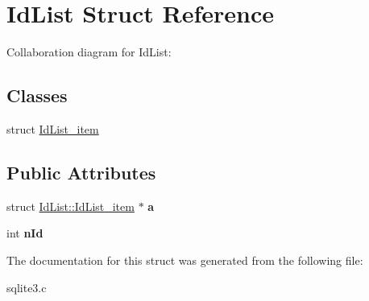 \hypertarget{structIdList}{}\section{Id\+List Struct Reference}
\label{structIdList}


Collaboration diagram for Id\+List\+:
\subsection*{Classes}
\begin{DoxyCompactItemize}
\item 
struct \hyperlink{structIdList_1_1IdList__item}{Id\+List\+\_\+item}
\end{DoxyCompactItemize}
\subsection*{Public Attributes}
\begin{DoxyCompactItemize}
\item 
struct \hyperlink{structIdList_1_1IdList__item}{Id\+List\+::\+Id\+List\+\_\+item} $\ast$ {\bfseries a}\hypertarget{structIdList_ad33082fd71286c1159711a1a3e979763}{}\label{structIdList_ad33082fd71286c1159711a1a3e979763}

\item 
int {\bfseries n\+Id}\hypertarget{structIdList_afb785717796d8b3c72d1ae682dcb6ff0}{}\label{structIdList_afb785717796d8b3c72d1ae682dcb6ff0}

\end{DoxyCompactItemize}


The documentation for this struct was generated from the following file\+:\begin{DoxyCompactItemize}
\item 
sqlite3.\+c\end{DoxyCompactItemize}
